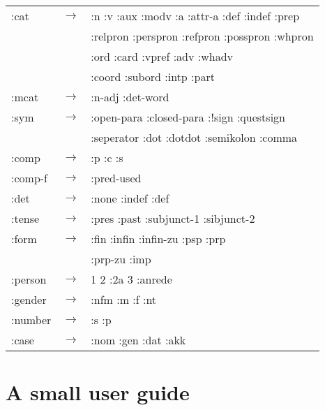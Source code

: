 \begin{tabular}{lll}
:cat     & $\rightarrow$ & :n :v :aux :modv :a :attr-a :def :indef :prep\\
         &               & :relpron :perspron :refpron :posspron :whpron \\
         &               & :ord :card :vpref :adv :whadv \\
         &               & :coord :subord  :intp :part\\
:mcat    & $\rightarrow$ & :n-adj :det-word\\
:sym     & $\rightarrow$ & :open-para :closed-para :!sign :questsign\\ 
         &               & :seperator :dot :dotdot :semikolon :comma\\
:comp    & $\rightarrow$ & :p :c :s\\
:comp-f  & $\rightarrow$ & :pred-used\\
:det     & $\rightarrow$ & :none :indef :def\\
:tense   & $\rightarrow$ & :pres :past :subjunct-1 :sibjunct-2\\
:form    & $\rightarrow$ & :fin :infin :infin-zu :psp :prp \\
         &               & :prp-zu :imp \\
:person  & $\rightarrow$ & 1 2 :2a 3 :anrede\\
:gender  & $\rightarrow$ & :nfm :m :f :nt\\
:number  & $\rightarrow$ & :s :p\\
:case    & $\rightarrow$ & :nom :gen :dat :akk\\     
\end{tabular}

\section{A small user guide}









